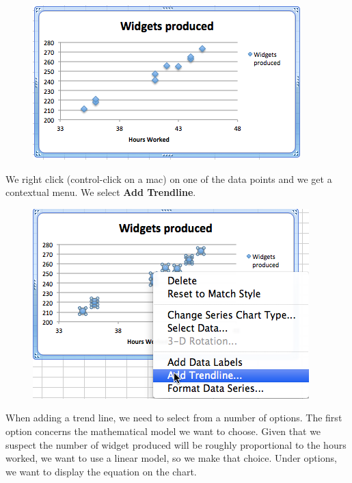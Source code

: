\documentclass[10pt,]{book}
\newcommand{\terminology}[1]{\textbf{#1}}
\theoremstyle{plain}
\theoremstyle{definition}
\theoremstyle{definition}
\begin{document}
  \leavevmode%
\begin{figure}
\centering
\includegraphics[width=0.8\linewidth]{images/sec1-5-2.png}
\end{figure}
 

%
\par
We right click (control-click on a mac) on one of the data points and we get a contextual menu.  We select \terminology{Add Trendline}.

  \leavevmode%
\begin{figure}
\centering
\includegraphics[width=0.8\linewidth]{images/sec1-5-3.png}
\end{figure}
 

%
\par
When adding a trend line, we need to select from a number of options.  The first option concerns the mathematical model we want to choose.  Given that we suspect the number of widget produced will be roughly proportional to the hours worked, we want to use a linear model, so we make that choice.  Under options, we want to display the equation on the chart.
\end{document}

